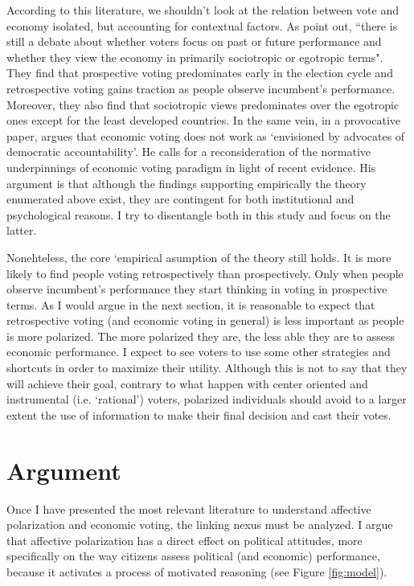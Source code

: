 \documentclass[a4paper, svgnames]{article}
\begin{document}
According to this literature, we shouldn't look at the relation between vote and economy isolated, but accounting for contextual factors. As \cite[p. 1]{Singer2015} point out, ``there is still a debate about whether voters focus on past or future performance and whether they view the economy in primarily sociotropic or egotropic terms". They find that prospective voting predominates early in the election cycle and retrospective voting gains traction as people observe incumbent's performance. Moreover, they also find that sociotropic views predominates over the egotropic ones except for the least developed countries. In the same vein, in a provocative paper, \cite[p. 1]{Anderson2007} argues that economic voting does not work as `envisioned by advocates of democratic accountability'. He  calls for a reconsideration of the normative underpinnings of economic voting paradigm in light of recent evidence. His argument is that although the findings supporting empirically the theory enumerated above exist, they are contingent for both institutional and psychological reasons. I try to disentangle both in this study and focus on the latter.

Nonehteless, the core `empirical asumption of the theory still holds. It is more likely to find people voting retrospectively than prospectively. Only when people observe incumbent's performance they start thinking in voting in prospective terms. As I would argue in the next section, it is reasonable to expect that retrospective voting (and economic voting in general) is less important as people is more polarized. The more polarized they are, the less able they are to assess economic performance. I expect to see voters to use some other strategies and shortcuts in order to maximize their utility. Although this is not to say that they will achieve their goal, contrary to what happen with center oriented and instrumental (i.e. `rational') voters, polarized individuals should avoid to a larger extent the use of information to make their final decision and cast their votes.

\section{Argument}

Once I have presented the most relevant literature to understand affective polarization and economic voting, the linking nexus must be analyzed. I argue that affective polarization has a direct effect on political attitudes, more specifically on the way citizens assess political (and economic) performance, because it activates a process of motivated reasoning (see Figure \ref{fig:model}).
\end{document}
